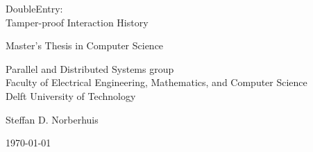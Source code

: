 \begin{titlepage}

  \begin{center}
  \null\vfill
    \begin{center}
    \LARGE{DoubleEntry:\\
		Tamper-proof Interaction History}
    \end{center}

    \vspace{3cm}

    \begin{large}
    Master's Thesis in Computer Science
    \end{large}

    \vspace{1.5cm}

    \begin{normalsize}
    Parallel and Distributed Systems group\\
    Faculty of Electrical Engineering, Mathematics, and Computer Science\\
    Delft University of Technology
    \end{normalsize}

    \vspace{2.0cm}

    \begin{normalsize}
    Steffan D. Norberhuis
    \end{normalsize}

    \vspace{1.0cm}

    \today            %

  \vfill
  \end{center}

\end{titlepage}

